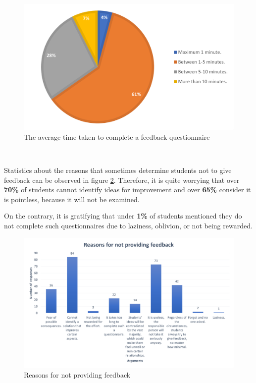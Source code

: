     ~
    
    \begin{figure}[ht]
        \centering
             \includegraphics[height=0.25\textheight]{figures/charts/survey/feedback_time.png}
        \caption{The average time taken to complete a feedback questionnaire}
        \label{3:fig:feedback_time}
    \end{figure}

    ~

    Statistics about the reasons that sometimes determine students not to give feedback can be observed in figure \ref{3:fig:reasons_no_feedback}. Therefore, it is quite worrying that over \textbf{70\%} of students cannot identify ideas for improvement and over \textbf{65\%} consider it  is pointless, because it will not be examined.
    
    On the contrary, it is gratifying that under \textbf{1\%} of students mentioned they do not complete such questionnaires due to laziness, oblivion, or not being rewarded.
    
    \clearpage
    
    \begin{figure}[ht]
        \centering
             \includegraphics[height=0.4\textheight]{figures/charts/survey/reasons_no_feedback.png}
        \caption{Reasons for not providing feedback}
        \label{3:fig:reasons_no_feedback}
    \end{figure}
    
